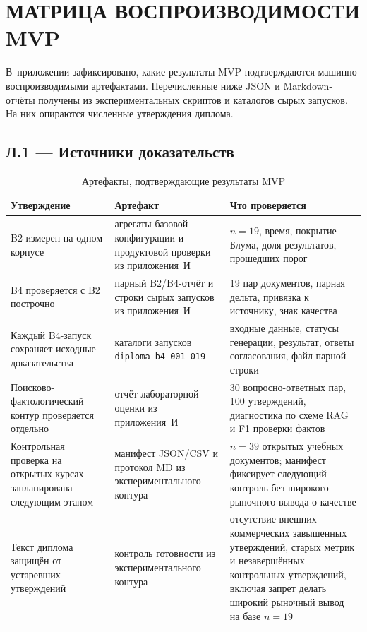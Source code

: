 \chapter{МАТРИЦА ВОСПРОИЗВОДИМОСТИ MVP}

В~приложении зафиксировано, какие результаты MVP подтверждаются
машинно воспроизводимыми артефактами. Перечисленные ниже JSON
и Markdown-отчёты получены из экспериментальных скриптов и каталогов сырых запусков.
На них опираются численные утверждения диплома.

\section*{Л.1 — Источники доказательств}

\begin{table}[htbp]
  \caption{Артефакты, подтверждающие результаты MVP}
  \label{tab:appendix-evidence-matrix}
  \centering
  \begin{tabular}{|P{4.0cm}|P{5.3cm}|P{4.2cm}|}
  \hline
  \textbf{Утверждение} & \textbf{Артефакт} & \textbf{Что проверяется} \\
  \hline
  B2 измерен на одном корпусе &
  агрегаты базовой конфигурации и продуктовой проверки из приложения~И
  & $n=19$, время, покрытие Блума, доля результатов, прошедших порог \\
  \hline
  B4 проверяется с B2 построчно &
  парный B2/B4-отчёт и строки сырых запусков из приложения~И
  & 19 пар документов, парная дельта, привязка к источнику, знак качества \\
  \hline
  Каждый B4-запуск сохраняет исходные доказательства &
  каталоги запусков \texttt{diploma-b4-001}–\texttt{019}
  & входные данные, статусы генерации, результат, ответы согласования,
  файл парной строки \\
  \hline
  Поисково-фактологический контур проверяется отдельно &
  отчёт лабораторной оценки из приложения~И
  & 30 вопросно-ответных пар, 100 утверждений, диагностика по схеме RAG и F1 проверки фактов \\
  \hline
  Контрольная проверка на открытых курсах запланирована следующим этапом &
  манифест JSON/CSV и протокол MD из экспериментального контура
  & $n=39$ открытых учебных документов; манифест фиксирует следующий
  контроль без широкого рыночного вывода о качестве \\
  \hline
  Текст диплома защищён от устаревших утверждений &
  контроль готовности из экспериментального контура
  & отсутствие внешних коммерческих завышенных утверждений, старых метрик и
  незавершённых контрольных утверждений, включая запрет делать широкий
  рыночный вывод на базе $n=19$ \\
  \hline
  \end{tabular}
\end{table}

